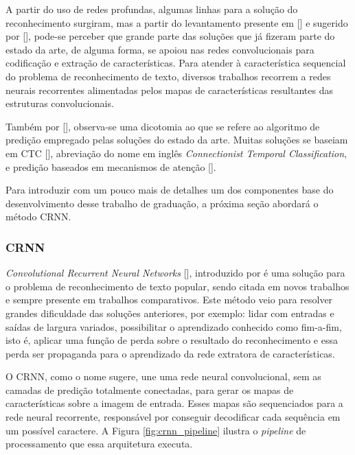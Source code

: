 A partir do uso de redes profundas, algumas linhas para a solução do reconhecimento surgiram, mas a partir do levantamento presente em [] 
e sugerido por [], pode-se perceber que grande parte das soluções que já fizeram parte do estado da arte, de alguma forma, se apoiou 
nas redes convolucionais para codificação e extração de características.
Para atender à característica sequencial do problema de reconhecimento de texto, diversos trabalhos recorrem a redes neurais recorrentes alimentadas pelos 
mapas de características resultantes das estruturas convolucionais.

Também por [], observa-se uma dicotomia ao que se refere ao algoritmo de predição empregado pelas soluções do estado da arte. 
Muitas soluções se baseiam em CTC [], abreviação do nome em inglês \textit{Connectionist Temporal Classification}, e predição baseados em 
mecanismos de atenção [].

Para introduzir com um pouco mais de detalhes um dos componentes base do desenvolvimento desse trabalho de graduação, a próxima seção abordará o método CRNN.


\subsubsection{CRNN} \label{crnn}
\textit{Convolutional Recurrent Neural Networks} [], introduzido por \citeauthor{CRNN} é uma solução para o problema de reconhecimento 
de texto popular, sendo citada em novos trabalhos e sempre presente em trabalhos comparativos. Este método veio para resolver grandes 
dificuldade das soluções anteriores, por exemplo: lidar com entradas e saídas de largura variados, possibilitar o aprendizado conhecido como fim-a-fim, 
isto é, aplicar uma função de perda sobre o resultado do reconhecimento e essa perda ser propaganda para o aprendizado da rede extratora de características.

O CRNN, como o nome sugere, une uma rede neural convolucional, sem as camadas de predição totalmente conectadas, para gerar os mapas de características 
sobre a imagem de entrada. Esses mapas são sequenciados para a rede neural recorrente, responsável por conseguir decodificar cada sequência em um possível 
caractere. A Figura \ref{fig:crnn_pipeline} ilustra o \textit{pipeline} de processamento que essa arquitetura executa.

